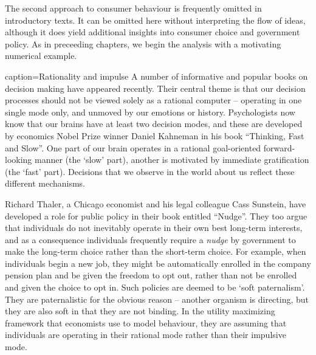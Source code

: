 The second approach to consumer behaviour is frequently omitted in
introductory texts. It can be omitted here without interpreting the flow of
ideas, although it does yield additional insights into consumer choice and
government policy. As in preceeding chapters, we begin the analysis with 
a motivating numerical example.

\newhtmlpage

\begin{ApplicationBox}{caption={Rationality and impulse \label{app:rationalimpulse}}}
	A number of informative and popular books on decision making have appeared recently. Their central theme is that our decision processes should not be viewed solely as a rational computer -- operating in one single mode only, and unmoved by our emotions or history. Psychologists now know that our brains have at least two decision modes, and these are developed by economics Nobel Prize winner Daniel Kahneman in his book ``Thinking, Fast and Slow''. One part of our brain operates in a rational goal-oriented forward-looking manner (the `slow' part), another is motivated by immediate gratification (the `fast' part). Decisions that we observe in the world about us reflect these different mechanisms. 
	
	Richard Thaler, a Chicago economist and his legal colleague Cass Sunstein, have developed a role for public policy in their book entitled ``Nudge''. They too argue that individuals do not inevitably operate in their own best long-term interests, and as a consequence individuals frequently require a \emph{nudge} by government to make the long-term choice rather than the short-term choice. For example, when individuals begin a new job, they might be automatically enrolled in the company pension plan and be given the freedom to opt out, rather than not be enrolled and given the choice to opt in. Such policies are deemed to be `soft paternalism'. They are paternalistic for the obvious reason -- another organism is directing, but they are also soft in that they are not binding. In the utility maximizing framework that economists use to model behaviour, they are assuming that individuals are operating in their rational mode rather than their impulsive mode.   
\end{ApplicationBox}